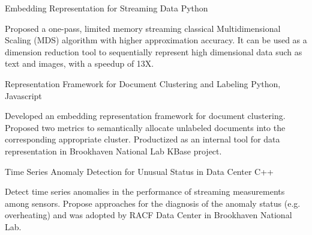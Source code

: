 


\begin{cventries}


\projentry
{Embedding Representation for Streaming Data} %
{Python} %
{ 
\begin{cvitems}
\item{Proposed a one-pass, limited memory streaming classical Multidimensional Scaling ({MDS}) algorithm with higher approximation accuracy. It can be used as a dimension reduction tool to sequentially represent high dimensional data such as text and images, with a speedup of 13X.}
\end{cvitems}
}



\projentry
{Representation Framework for Document Clustering and Labeling} %
{Python, Javascript} %
{ 
\begin{cvitems}
\item{Developed an embedding representation framework for document clustering. Proposed two metrics to semantically allocate unlabeled documents into the corresponding appropriate cluster. Productized as an internal tool for data representation in Brookhaven National Lab KBase project.}
\end{cvitems}
}


\projentry
{Time Series Anomaly Detection for Unusual Status in Data Center} %
{C++} %
{ %
\begin{cvitems}
\item{Detect time series anomalies in the performance of streaming measurements among sensors. Propose approaches for the diagnosis of the anomaly status (e.g. overheating) and was adopted by RACF Data Center in Brookhaven National Lab.}
\end{cvitems}
}


\end{cventries}
